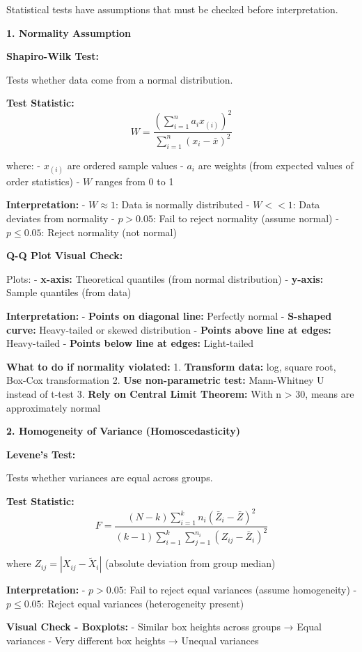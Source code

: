 \documentclass[11pt]{article}
\begin{document}
Statistical tests have assumptions that must be checked before
interpretation.

\textbf{1. Normality Assumption}

\textbf{Shapiro-Wilk Test:}

Tests whether data come from a normal distribution.

\textbf{Test Statistic:}
\[W = \frac{\left(\sum_{i=1}^{n} a_i x_{(i)}\right)^2}{\sum_{i=1}^{n}(x_i - \bar{x})^2}\]

where: - \(x_{(i)}\) are ordered sample values - \(a_i\) are weights
(from expected values of order statistics) - \(W\) ranges from 0 to 1

\textbf{Interpretation:} - \(W \approx 1\): Data is normally distributed
- \(W << 1\): Data deviates from normality - \(p > 0.05\): Fail to
reject normality (assume normal) - \(p \leq 0.05\): Reject normality
(not normal)

\textbf{Q-Q Plot Visual Check:}

Plots: - \textbf{x-axis:} Theoretical quantiles (from normal
distribution) - \textbf{y-axis:} Sample quantiles (from data)

\textbf{Interpretation:} - \textbf{Points on diagonal line:} Perfectly
normal - \textbf{S-shaped curve:} Heavy-tailed or skewed distribution -
\textbf{Points above line at edges:} Heavy-tailed - \textbf{Points below
line at edges:} Light-tailed

\textbf{What to do if normality violated:} 1. \textbf{Transform data:}
log, square root, Box-Cox transformation 2. \textbf{Use non-parametric
test:} Mann-Whitney U instead of t-test 3. \textbf{Rely on Central Limit
Theorem:} With n \textgreater{} 30, means are approximately normal

\textbf{2. Homogeneity of Variance (Homoscedasticity)}

\textbf{Levene's Test:}

Tests whether variances are equal across groups.

\textbf{Test Statistic:}
\[F = \frac{(N-k)\sum_{i=1}^{k}n_i(\bar{Z}_i - \bar{Z})^2}{(k-1)\sum_{i=1}^{k}\sum_{j=1}^{n_i}(Z_{ij} - \bar{Z}_i)^2}\]

where \(Z_{ij} = |X_{ij} - \tilde{X}_i|\) (absolute deviation from group
median)

\textbf{Interpretation:} - \(p > 0.05\): Fail to reject equal variances
(assume homogeneity) - \(p \leq 0.05\): Reject equal variances
(heterogeneity present)

\textbf{Visual Check - Boxplots:} - Similar box heights across groups →
Equal variances - Very different box heights → Unequal variances
\end{document}
